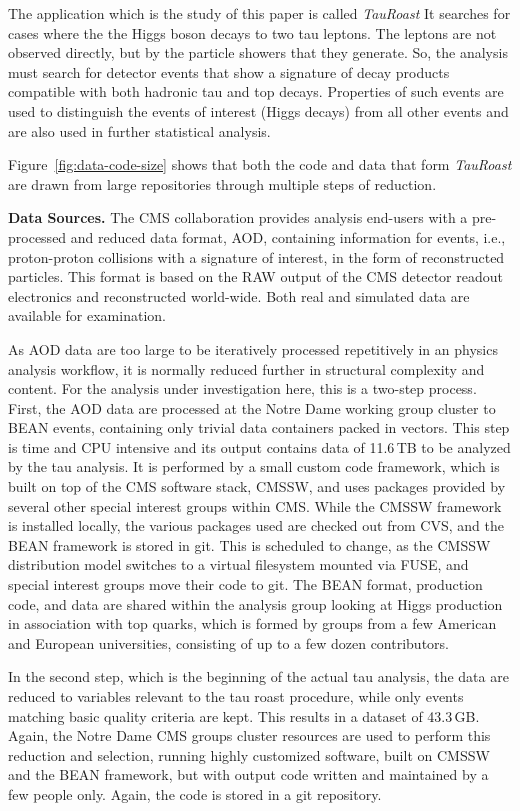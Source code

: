 \documentclass{acm_proc_article-sp}
\begin{document}
The application which is the study of this paper is called \emph{TauRoast}
It searches for cases where the the Higgs boson decays to two tau leptons.
The leptons are not observed directly, but by the particle showers
that they generate.  So, the analysis must search for detector
events that show a signature of decay products compatible with both hadronic tau and top decays.  Properties of such events are used to distinguish
the events of interest (Higgs decays) from all other events and
are also used in further statistical analysis.

Figure~\ref{fig:data-code-size} shows that both the code and data
that form \emph{TauRoast} are drawn from large repositories through
multiple steps of reduction.

{\bf Data Sources.}
The CMS collaboration provides analysis end-users with a pre-processed
and reduced data format, AOD, containing information for events, i.e.,
proton-proton collisions with a signature of interest, in the form of
reconstructed particles.  This format is based on the RAW output of
the CMS detector readout electronics and reconstructed world-wide.
Both real and simulated data are available for examination.

As AOD data are too large to be iteratively processed repetitively in
an physics analysis workflow, it is normally reduced further in
structural complexity and content.  For the analysis under
investigation here, this is a two-step process.  First, the AOD data
are processed at the Notre Dame working group cluster to BEAN events,
containing only trivial data containers packed in vectors.  This step
is time and CPU intensive and its output contains data of 11.6$\,$TB to be
analyzed by the tau analysis.
It is performed by a small custom code framework,
which is built on top of the CMS software stack, CMSSW,
and uses packages provided by several other special interest groups within CMS.
While the CMSSW framework is installed locally,
the various packages used are checked out from CVS,
and the BEAN framework is stored in git.
This is scheduled to change,
as the CMSSW distribution model switches to a virtual filesystem mounted via FUSE,
and special interest groups move their code to git.
The BEAN format, production code, and
data are shared within the analysis group looking at Higgs production
in association with top quarks, which is formed by groups from a few
American and European universities,
consisting of up to a few dozen contributors.

In the second step, which is the beginning of the actual tau analysis,
the data are reduced to variables relevant to the tau roast procedure, while
only events matching basic quality criteria are kept.  This results in
a dataset of 43.3$\,$GB.  Again, the Notre Dame CMS groups cluster
resources are used to perform this reduction and selection,
running highly customized software,
built on CMSSW and the BEAN framework,
but with output code written and maintained by a few people only.
Again, the code is stored in a git repository.
\end{document}
